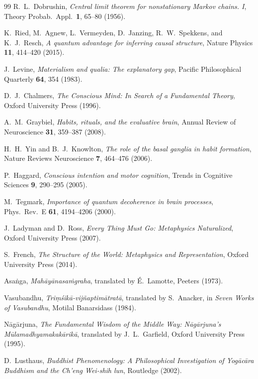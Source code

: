\documentclass[11pt,a4paper]{article}
\begin{document}
\begin{thebibliography}{99}
R.~L.~Dobrushin, \emph{Central limit theorem for nonstationary Markov chains. I}, Theory Probab.\ Appl.\ \textbf{1}, 65--80 (1956).

K.~Ried, M.~Agnew, L.~Vermeyden, D.~Janzing, R.~W.~Spekkens, and K.~J.~Resch, \emph{A quantum advantage for inferring causal structure}, Nature Physics \textbf{11}, 414--420 (2015).

J.~Levine, \emph{Materialism and qualia: The explanatory gap}, Pacific Philosophical Quarterly \textbf{64}, 354 (1983).

D.~J.~Chalmers, \emph{The Conscious Mind: In Search of a Fundamental Theory}, Oxford University Press (1996).

A.~M.~Graybiel, \emph{Habits, rituals, and the evaluative brain}, Annual Review of Neuroscience \textbf{31}, 359--387 (2008).

H.~H.~Yin and B.~J.~Knowlton, \emph{The role of the basal ganglia in habit formation}, Nature Reviews Neuroscience \textbf{7}, 464--476 (2006).

P.~Haggard, \emph{Conscious intention and motor cognition}, Trends in Cognitive Sciences \textbf{9}, 290--295 (2005).

M.~Tegmark, \emph{Importance of quantum decoherence in brain processes}, Phys.\ Rev.\ E \textbf{61}, 4194--4206 (2000).

J.~Ladyman and D.~Ross, \emph{Every Thing Must Go: Metaphysics Naturalized}, Oxford University Press (2007).

S.~French, \emph{The Structure of the World: Metaphysics and Representation}, Oxford University Press (2014).

Asa\.nga, \emph{Mah\=ay\=anasa\.mgraha}, translated by \'E.~Lamotte, Peeters (1973).

Vasubandhu, \emph{Tri\d{m}\'sik\=a-vij\~naptim\=atrat\=a}, translated by S.~Anacker, in \emph{Seven Works of Vasubandhu}, Motilal Banarsidass (1984).

N\=ag\=arjuna, \emph{The Fundamental Wisdom of the Middle Way: N\=ag\=arjuna's M\=ula\-madhyamaka\-k\=arik\=a}, translated by J.~L.~Garfield, Oxford University Press (1995).

D.~Lusthaus, \emph{Buddhist Phenomenology: A Philosophical Investigation of Yog\=ac\=ara Buddhism and the Ch'eng Wei-shih lun}, Routledge (2002).


\end{thebibliography}
\end{document}
